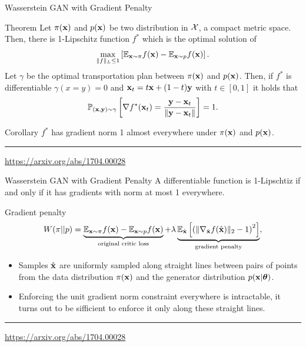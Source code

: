 \begin{frame}{Wasserstein GAN with Gradient Penalty}
	\begin{block}{Theorem}
		Let $\pi(\mathbf{x})$ and $p(\mathbf{x})$ be two distribution in $\mathcal{X}$, a compact metric space. Then, there is 1-Lipschitz function $f^*$ which is the optimal solution of 
		\[
			\max_{\| f \|_L \leq 1} \left[ \mathbb{E}_{\mathbf{x} \sim \pi} f(\mathbf{x})  - \mathbb{E}_{\mathbf{x} \sim p} f(\mathbf{x})\right].
		\]
		Let $\gamma$ be the optimal transportation plan between $\pi(\mathbf{x})$ and $p(\mathbf{x})$. Then, if $f^*$ is differentiable $\gamma(x = y) = 0$ and $\mathbf{x}_t = t \mathbf{x} + (1 - t) \mathbf{y}$ with $t \in [0, 1]$ it holds that
		\[
			\mathbb{P}_{(\mathbf{x}, \mathbf{y}) \sim \gamma} \left[ \nabla f^*(\mathbf{x}_t) = \frac{\mathbf{y} - \mathbf{x}_t}{\| \mathbf{y} - \mathbf{x}_t \|} \right] = 1.
		\]
	\end{block}
	\begin{block}{Corollary}
		$f^*$ has gradient norm 1 almost everywhere under $\pi(\mathbf{x})$ and $p(\mathbf{x})$.
	\end{block}
	\vfill
	\hrule\medskip 
	{\scriptsize \href{https://arxiv.org/abs/1704.00028}{https://arxiv.org/abs/1704.00028}}
\end{frame}
\begin{frame}{Wasserstein GAN with Gradient Penalty}
	A differentiable function is 1-Lipschtiz if and only if it has gradients with norm at most 1 everywhere.
	\begin{block}{Gradient penalty}
		\[
			W(\pi || p) = \underbrace{\mathbb{E}_{\mathbf{x} \sim \pi} f(\mathbf{x})  - \mathbb{E}_{\mathbf{x} \sim p} f(\mathbf{x})}_{\text{original critic loss}} + \lambda \underbrace{\mathbb{E}_{\hat{\mathbf{x}}} \left[ \left( \| \nabla_{\hat{\mathbf{x}}} f(\hat{\mathbf{x}}) \|_2 - 1 \right) ^ 2\right]}_{\text{gradient penalty}},
		\]
	\end{block}
	\begin{itemize}
		\item Samples $\hat{\mathbf{x}}$ are uniformly sampled along straight lines between pairs of points from the data distribution $\pi(\mathbf{x})$ and the generator distribution $p(\mathbf{x} | \boldsymbol{\theta})$.
		\item Enforcing the unit gradient norm constraint everywhere is intractable, it turns out to be sifficient to enforce it only along these straight lines.
	\end{itemize}
	\vfill
	\hrule\medskip 
	{\scriptsize \href{https://arxiv.org/abs/1704.00028}{https://arxiv.org/abs/1704.00028}}
\end{frame}
